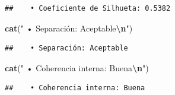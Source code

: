 \documentclass[
]{article}
\newenvironment{Shaded}{\begin{snugshade}}{\end{snugshade}}
\newcommand{\FunctionTok}[1]{\textcolor[rgb]{0.13,0.29,0.53}{\textbf{#1}}}
\newcommand{\NormalTok}[1]{#1}
\newcommand{\SpecialCharTok}[1]{\textcolor[rgb]{0.81,0.36,0.00}{\textbf{#1}}}
\newcommand{\StringTok}[1]{\textcolor[rgb]{0.31,0.60,0.02}{#1}}
\begin{document}
\begin{verbatim}
##    • Coeficiente de Silhueta: 0.5382
\end{verbatim}

\begin{Shaded}
\begin{Highlighting}[]
\FunctionTok{cat}\NormalTok{(}\StringTok{"   • Separación: Aceptable}\SpecialCharTok{\textbackslash{}n}\StringTok{"}\NormalTok{)}
\end{Highlighting}
\end{Shaded}

\begin{verbatim}
##    • Separación: Aceptable
\end{verbatim}

\begin{Shaded}
\begin{Highlighting}[]
\FunctionTok{cat}\NormalTok{(}\StringTok{"   • Coherencia interna: Buena}\SpecialCharTok{\textbackslash{}n}\StringTok{"}\NormalTok{)}
\end{Highlighting}
\end{Shaded}

\begin{verbatim}
##    • Coherencia interna: Buena
\end{verbatim}
\end{document}
